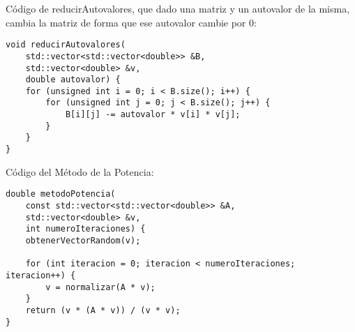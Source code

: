 Código de reducirAutovalores, que dado una matriz y un autovalor de la misma,
cambia la matriz de forma que ese autovalor cambie por 0:
\begin{lstlisting}
void reducirAutovalores(
    std::vector<std::vector<double>> &B,
    std::vector<double> &v,
    double autovalor) {
    for (unsigned int i = 0; i < B.size(); i++) {
        for (unsigned int j = 0; j < B.size(); j++) {
            B[i][j] -= autovalor * v[i] * v[j];
        }
    }
}
\end{lstlisting}
\pagebreak
Código del Método de la Potencia:
\begin{lstlisting}
double metodoPotencia(
    const std::vector<std::vector<double>> &A,
    std::vector<double> &v,
    int numeroIteraciones) {
    obtenerVectorRandom(v);

    for (int iteracion = 0; iteracion < numeroIteraciones; iteracion++) {
        v = normalizar(A * v);
    }
    return (v * (A * v)) / (v * v);
}
\end{lstlisting}
